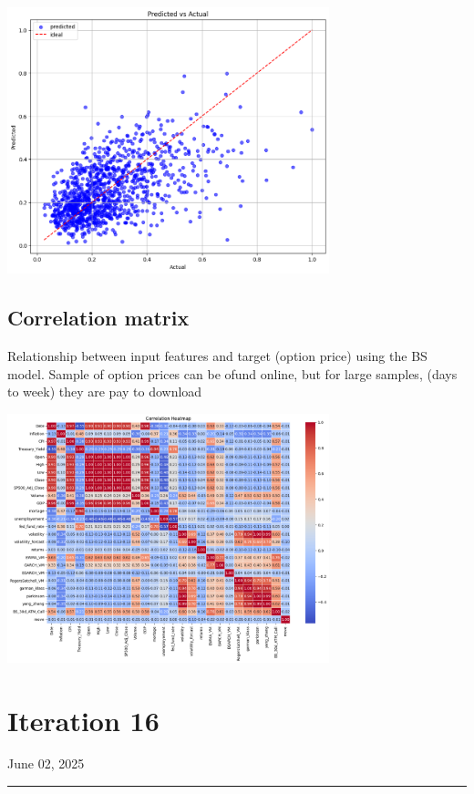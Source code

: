 \documentclass[letterpaper,11pt]{article}
\begin{document}
\bigskip


\begin{center}
\includegraphics[width=0.7\textwidth]{img/PVSA_opt_base_model.png}
\end{center}





\subsection*{Correlation matrix}
Relationship between input features and target (option price) using the BS model.
Sample of option prices can be ofund online, but for large samples, (days to week) they are pay to download

\begin{center}
\includegraphics[width=0.7\textwidth]{img/corr_matrix_opt.png}
\end{center}









\newpage
\section*{Iteration 16}
\begin{flushright}
June 02, 2025
\end{flushright}
\hrule
\vspace{0.2in}
\end{document}

